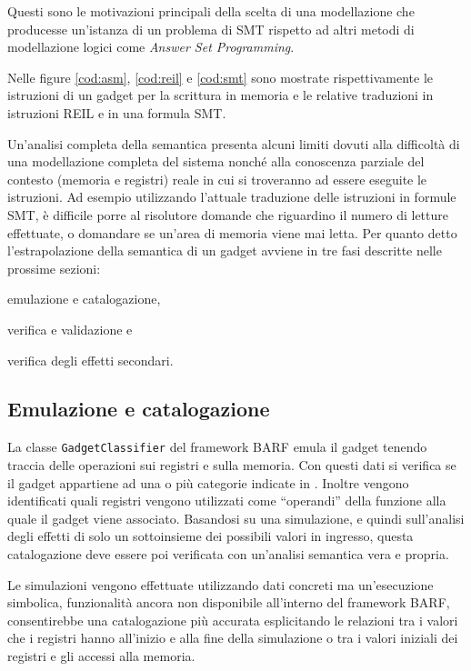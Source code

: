 Questi sono le motivazioni principali della scelta di una modellazione
che producesse un'istanza di un problema di SMT rispetto ad altri
metodi di modellazione logici come \emph{Answer Set Programming}.

Nelle figure \ref{cod:asm}, \ref{cod:reil} e \ref{cod:smt} sono
mostrate rispettivamente le istruzioni di un gadget per la scrittura
in memoria e le relative traduzioni in istruzioni REIL e in una
formula SMT.

Un'analisi completa della semantica presenta alcuni limiti dovuti alla
difficoltà di una modellazione completa del sistema nonché alla
conoscenza parziale del contesto (memoria e registri) reale in cui si
troveranno ad essere eseguite le istruzioni. Ad esempio utilizzando
l'attuale traduzione delle istruzioni in formule SMT, è difficile
porre al risolutore domande che riguardino il numero di letture
effettuate, o domandare se un'area di memoria viene mai letta. Per
quanto detto l'estrapolazione della semantica di un gadget avviene in
tre fasi descritte nelle prossime sezioni:
\begin{inparaenum}[a)]
\item emulazione e catalogazione, 
\item verifica e validazione e 
\item verifica degli effetti secondari.
\end{inparaenum}



\subsection{Emulazione e catalogazione}
La classe \lstinline{GadgetClassifier} del framework BARF emula il
gadget tenendo traccia delle operazioni sui registri e sulla
memoria. Con questi dati si verifica se il gadget appartiene ad una o
più categorie indicate in \cite{schwartz-2011}.
Inoltre vengono identificati quali registri vengono utilizzati come
``operandi'' della funzione alla quale il gadget viene
associato. Basandosi su una simulazione, e quindi sull'analisi degli
effetti di solo un sottoinsieme dei possibili valori in ingresso,
questa catalogazione deve essere poi verificata con un'analisi
semantica vera e propria.

Le simulazioni vengono effettuate utilizzando dati concreti ma
un'esecuzione simbolica, funzionalità ancora non disponibile
all'interno del framework BARF, consentirebbe una catalogazione più
accurata esplicitando le relazioni tra i valori che i registri hanno
all'inizio e alla fine della simulazione o tra i valori iniziali dei
registri e gli accessi alla memoria.

